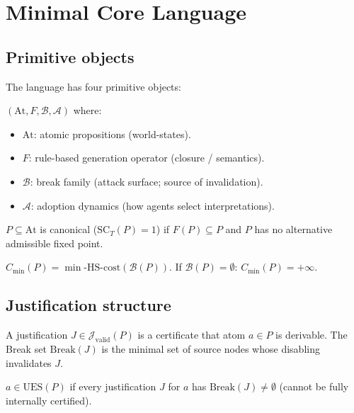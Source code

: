 \section{Minimal Core Language}
\label{sec:core}

\subsection{Primitive objects}

The language has four primitive objects:

\begin{definition}
$(\mathrm{At}, F, \mathcal{B}, \mathcal{A})$ where:
\begin{itemize}
  \item $\mathrm{At}$: atomic propositions (world-states).
  \item $F$: rule-based generation operator (closure / semantics).
  \item $\mathcal{B}$: break family (attack surface; source of invalidation).
  \item $\mathcal{A}$: adoption dynamics (how agents select interpretations).
\end{itemize}
\end{definition}

\begin{definition}
$P\subseteq\mathrm{At}$ is canonical ($\mathrm{SC}_T(P)=1$) if $F(P)\subseteq P$
and $P$ has no alternative admissible fixed point.
\end{definition}

\begin{definition}
$C_{\min}(P) = \min\text{-HS-cost}(\mathcal{B}(P))$.
If $\mathcal{B}(P)=\emptyset$: $C_{\min}(P)=+\infty$.
\end{definition}

\subsection{Justification structure}

A justification $J\in\mathcal{J}_{\mathrm{valid}}(P)$ is a certificate that
atom $a\in P$ is derivable. The Break set $\mathrm{Break}(J)$ is the
minimal set of source nodes whose disabling invalidates $J$.

\begin{definition}\label{def:ues}
$a\in\mathrm{UES}(P)$ if every justification $J$ for $a$ has
$\mathrm{Break}(J)\neq\emptyset$ (cannot be fully internally certified).
\end{definition}

